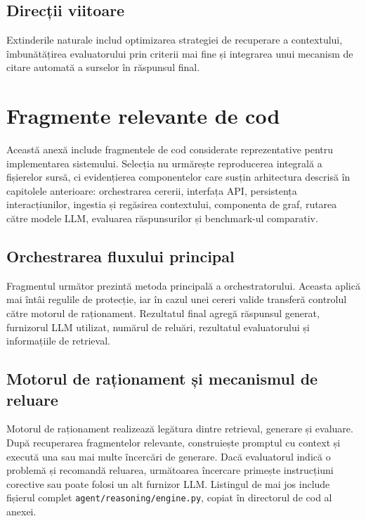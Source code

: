 \documentclass[12pt, a4paper, oneside, romanian]{teza-upb}
\begin{document}
\section{Direcții viitoare}
Extinderile naturale includ optimizarea strategiei de recuperare a contextului, îmbunătățirea evaluatorului prin criterii mai fine și integrarea unui mecanism de citare automată a surselor în răspunsul final.




\appendix
\chapter{Fragmente relevante de cod}

Această anexă include fragmentele de cod considerate reprezentative pentru implementarea sistemului. Selecția nu urmărește reproducerea integrală a fișierelor sursă, ci evidențierea componentelor care susțin arhitectura descrisă în capitolele anterioare: orchestrarea cererii, interfața API, persistența interacțiunilor, ingestia și regăsirea contextului, componenta de graf, rutarea către modele LLM, evaluarea răspunsurilor și benchmark-ul comparativ.

\section{Orchestrarea fluxului principal}

Fragmentul următor prezintă metoda principală a orchestratorului. Aceasta aplică mai întâi regulile de protecție, iar în cazul unei cereri valide transferă controlul către motorul de raționament. Rezultatul final agregă răspunsul generat, furnizorul LLM utilizat, numărul de reluări, rezultatul evaluatorului și informațiile de retrieval.

\label{anexa:orchestrator-flow}


\section{Motorul de raționament și mecanismul de reluare}

Motorul de raționament realizează legătura dintre retrieval, generare și evaluare. După recuperarea fragmentelor relevante, construiește promptul cu context și execută una sau mai multe încercări de generare. Dacă evaluatorul indică o problemă și recomandă reluarea, următoarea încercare primește instrucțiuni corective sau poate folosi un alt furnizor LLM. Listingul de mai jos include fișierul complet \texttt{agent/reasoning/engine.py}, copiat în directorul de cod al anexei.
\end{document}
